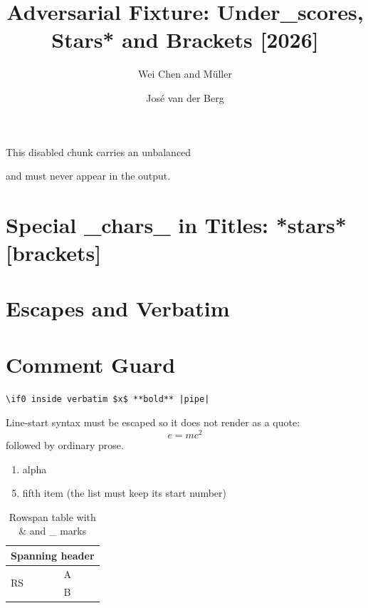 \documentclass{article}
\title{Adversarial Fixture: Under_scores, Stars* and Brackets [2026]}
\author{Wei Chen and M\"uller \and Jos\'e van der Berg}
\begin{document}
\maketitle


This disabled chunk carries an unbalanced \begin{enumerate} and must
never appear in the output.
\else
\section{Special _chars_ in Titles: *stars* [brackets]}
\fi

\iffalse
\section{Never Typeset}
\else
\section{Escapes and Verbatim}
\fi

\section{Comment Guard}

\begin{verbatim}
\if0 inside verbatim $x$ **bold** |pipe|
\end{verbatim}

Line-start syntax must be escaped so it does not render as a quote:
\[e = mc^2\]
followed by ordinary prose.

\begin{enumerate}
\item alpha
\end{enumerate}

\begin{enumerate}
\setcounter{enumi}{4}
\item fifth item (the list must keep its start number)
\end{enumerate}

\begin{table}[h]
\begin{tabular}{|l|l|}
\hline
\multicolumn{2}{|c|}{Spanning header} \\
\hline
\multirow{2}{*}{RS} & A \\
 & B \\
\hline
\end{tabular}
\caption{Rowspan table with \& and \_ marks}
\end{table}


\end{enumerate}
\end{document}
